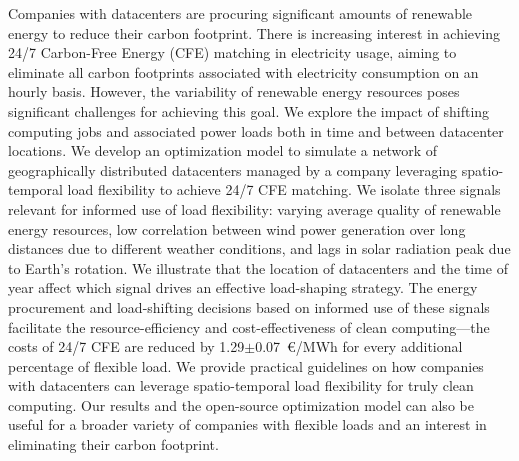%

Companies with datacenters are procuring significant amounts of renewable energy to reduce their carbon footprint.
There is increasing interest in achieving 24/7 Carbon-Free Energy (CFE) matching in electricity usage, aiming to eliminate all carbon footprints associated with electricity consumption on an hourly basis.
However, the variability of renewable energy resources poses significant challenges for achieving this goal.
We explore the impact of shifting computing jobs and associated power loads both in time and between datacenter locations.
We develop an optimization model to simulate a network of geographically distributed datacenters managed by a company leveraging spatio-temporal load flexibility to achieve 24/7 CFE matching.
We isolate three signals relevant for informed use of load flexibility: varying average quality of renewable energy resources, low correlation between wind power generation over long distances due to different weather conditions, and lags in solar radiation peak due to Earth's rotation.
We illustrate that the location of datacenters and the time of year affect which signal drives an effective load-shaping strategy.
The energy procurement and load-shifting decisions based on informed use of these signals facilitate the resource-efficiency and cost-effectiveness of clean computing---the costs of 24/7 CFE are reduced by 1.29$\pm$0.07~\euro/MWh for every additional percentage of flexible load.
We provide practical guidelines on how companies with datacenters can leverage spatio-temporal load flexibility for truly clean computing.
Our results and the open-source optimization model can also be useful for a broader variety of companies with flexible loads and an interest in eliminating their carbon footprint.